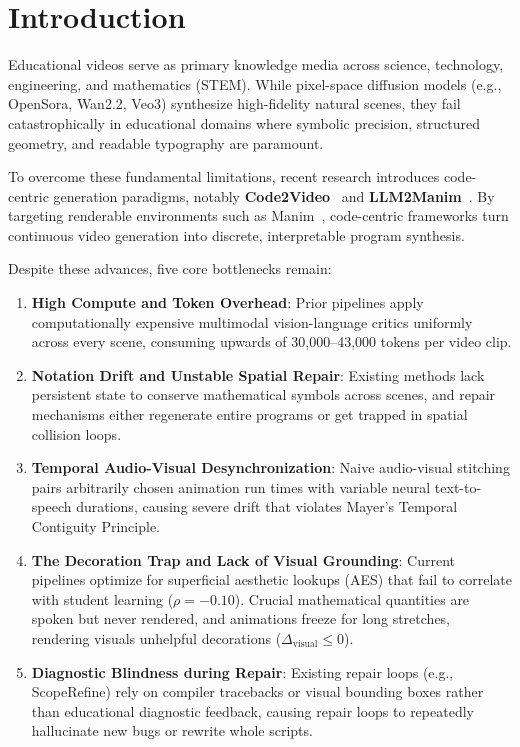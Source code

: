 \documentclass{article}
\begin{document}
\section{Introduction}
\label{sec:intro}
Educational videos serve as primary knowledge media across science, technology, engineering, and mathematics (STEM). While pixel-space diffusion models (e.g., OpenSora, Wan2.2, Veo3) synthesize high-fidelity natural scenes, they fail catastrophically in educational domains where symbolic precision, structured geometry, and readable typography are paramount.

To overcome these fundamental limitations, recent research introduces code-centric generation paradigms, notably \textbf{Code2Video}~\cite{chen2025code2video} and \textbf{LLM2Manim}~\cite{joshi2026llm2manim}. By targeting renderable environments such as Manim~\cite{manimdev2025}, code-centric frameworks turn continuous video generation into discrete, interpretable program synthesis. 

Despite these advances, five core bottlenecks remain:
\begin{enumerate}
    \item \textbf{High Compute and Token Overhead}: Prior pipelines apply computationally expensive multimodal vision-language critics uniformly across every scene, consuming upwards of 30,000--43,000 tokens per video clip.
    \item \textbf{Notation Drift and Unstable Spatial Repair}: Existing methods lack persistent state to conserve mathematical symbols across scenes, and repair mechanisms either regenerate entire programs or get trapped in spatial collision loops.
    \item \textbf{Temporal Audio-Visual Desynchronization}: Naive audio-visual stitching pairs arbitrarily chosen animation run times with variable neural text-to-speech durations, causing severe drift that violates Mayer's Temporal Contiguity Principle.
    \item \textbf{The Decoration Trap and Lack of Visual Grounding}: Current pipelines optimize for superficial aesthetic lookups (AES) that fail to correlate with student learning ($\rho = -0.10$). Crucial mathematical quantities are spoken but never rendered, and animations freeze for long stretches, rendering visuals unhelpful decorations ($\Delta_{\text{visual}} \le 0$).
    \item \textbf{Diagnostic Blindness during Repair}: Existing repair loops (e.g., ScopeRefine) rely on compiler tracebacks or visual bounding boxes rather than educational diagnostic feedback, causing repair loops to repeatedly hallucinate new bugs or rewrite whole scripts.
\end{enumerate}
\end{document}
